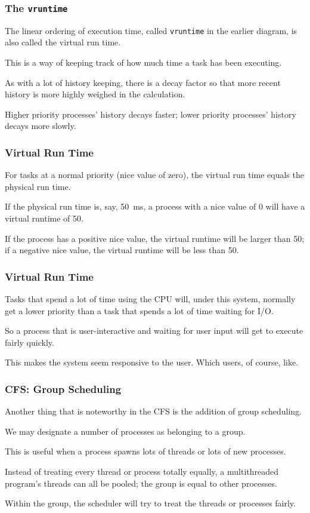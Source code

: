 \begin{frame}
\frametitle{The \texttt{vruntime}}

The linear ordering of execution time, called \texttt{vruntime} in the earlier diagram, is also called the \alert{virtual run time}.

 This is a way of keeping track of how much time a task has been executing. 
 
 As with a lot of history keeping, there is a decay factor so that more recent history is more highly weighed in the calculation. 
 
 Higher priority processes' history decays faster; lower priority processes' history decays more slowly. 
 

\end{frame}

\begin{frame}
\frametitle{Virtual Run Time}

For tasks at a normal priority (nice value of zero), the virtual run time equals the physical run time. 

If the physical run time is, say, 50~ms, a process with a nice value of 0 will have a virtual runtime of 50. 

If the process has a positive nice value, the virtual runtime will be larger than 50; if a negative nice value, the virtual runtime will be less than 50.

\end{frame}



\begin{frame}
\frametitle{Virtual Run Time}

Tasks that spend a lot of time using the CPU will, under this system, normally get a lower priority than a task that spends a lot of time waiting for I/O.

So a process that is user-interactive and waiting for user input will get to execute fairly quickly.

This makes the system seem responsive to the user. Which users, of course, like.

\end{frame}

\begin{frame}
\frametitle{CFS: Group Scheduling}

Another thing that is noteworthy in the CFS is the addition of group scheduling. 

We may designate a number of processes as belonging to a group. 

This is useful when a process spawns lots of threads or lots of new processes. 

Instead of treating every thread or process totally equally, a multithreaded program's threads can all be pooled; the group is equal to other processes. 

Within the group, the scheduler will try to treat the threads or processes fairly.

\end{frame}

